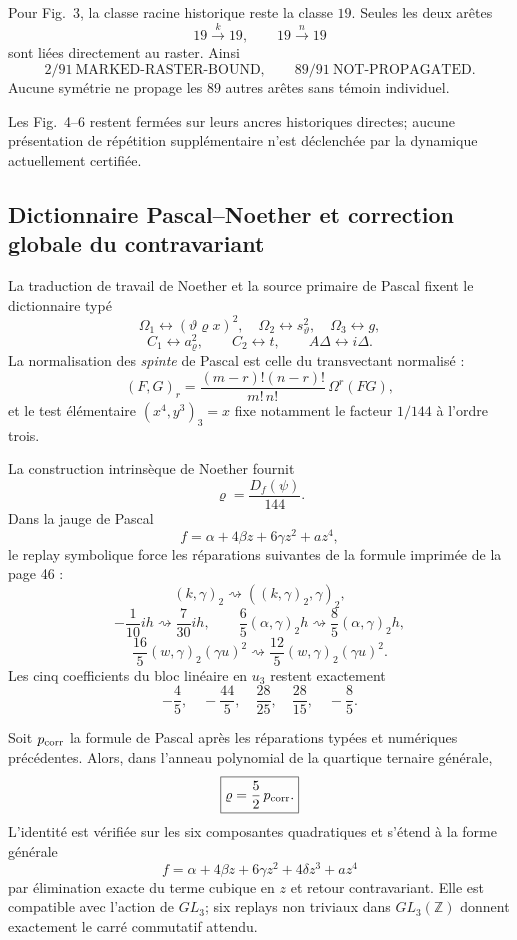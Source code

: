 Pour Fig.~3, la classe racine historique reste la classe $19$. Seules les deux arêtes
\[
 19\xrightarrow{k}19,\qquad 19\xrightarrow{n}19
\]
sont liées directement au raster. Ainsi
\[
 \boxed{2/91\ \text{MARKED-RASTER-BOUND},\qquad 89/91\ \text{NOT-PROPAGATED}.}
\]
Aucune symétrie ne propage les $89$ autres arêtes sans témoin individuel.

Les Fig.~4--6 restent fermées sur leurs ancres historiques directes; aucune présentation de
répétition supplémentaire n'est déclenchée par la dynamique actuellement certifiée.

\subsection{Dictionnaire Pascal--Noether et correction globale du contravariant}\label{subsec:v54-p46}

La traduction de travail de Noether et la source primaire de Pascal fixent le dictionnaire typé
\[
\Omega_1\leftrightarrow(\vartheta\varrho x)^2,\quad
\Omega_2\leftrightarrow s_\vartheta^2,\quad
\Omega_3\leftrightarrow g,
\]
\[
C_1\leftrightarrow a_\varrho^2,\qquad C_2\leftrightarrow t,
\qquad A\Delta\leftrightarrow i\Delta .
\]
La normalisation des \emph{spinte} de Pascal est celle du transvectant normalisé :
\[
 (F,G)_r=\frac{(m-r)!(n-r)!}{m!\,n!}\,\Omega^r(FG),
\]
et le test élémentaire $(x^4,y^3)_3=x$ fixe notamment le facteur $1/144$ à l'ordre trois.

La construction intrinsèque de Noether fournit
\[
 \varrho=\frac{D_f(\psi)}{144}.
\]
Dans la jauge de Pascal
\[
 f=\alpha+4\beta z+6\gamma z^2+a z^4,
\]
le replay symbolique force les réparations suivantes de la formule imprimée de la page 46 :
\[
 (k,\gamma)_2\rightsquigarrow ((k,\gamma)_2,\gamma)_2,
\]
\[
 -\frac1{10}ih\rightsquigarrow\frac7{30}ih,\qquad
 \frac65(\alpha,\gamma)_2h\rightsquigarrow\frac85(\alpha,\gamma)_2h,
\]
\[
 \frac{16}{5}(w,\gamma)_2(\gamma u)^2
 \rightsquigarrow
 \frac{12}{5}(w,\gamma)_2(\gamma u)^2.
\]
Les cinq coefficients du bloc linéaire en $u_3$ restent exactement
\[
 -\frac45,\quad -\frac{44}{5},\quad \frac{28}{25},\quad
 \frac{28}{15},\quad -\frac85.
\]

\begin{theorem}\label{thm:v54-p46-global}
Soit $p_{\rm corr}$ la formule de Pascal après les réparations typées et numériques précédentes.
Alors, dans l'anneau polynomial de la quartique ternaire générale,
\[
 \boxed{\varrho=\frac52\,p_{\rm corr}.}
\]
L'identité est vérifiée sur les six composantes quadratiques et s'étend à la forme générale
\[
 f=\alpha+4\beta z+6\gamma z^2+4\delta z^3+a z^4
\]
par élimination exacte du terme cubique en $z$ et retour contravariant. Elle est compatible avec
l'action de $GL_3$; six replays non triviaux dans $GL_3(\mathbb Z)$ donnent exactement le carré
commutatif attendu.
\end{theorem}

